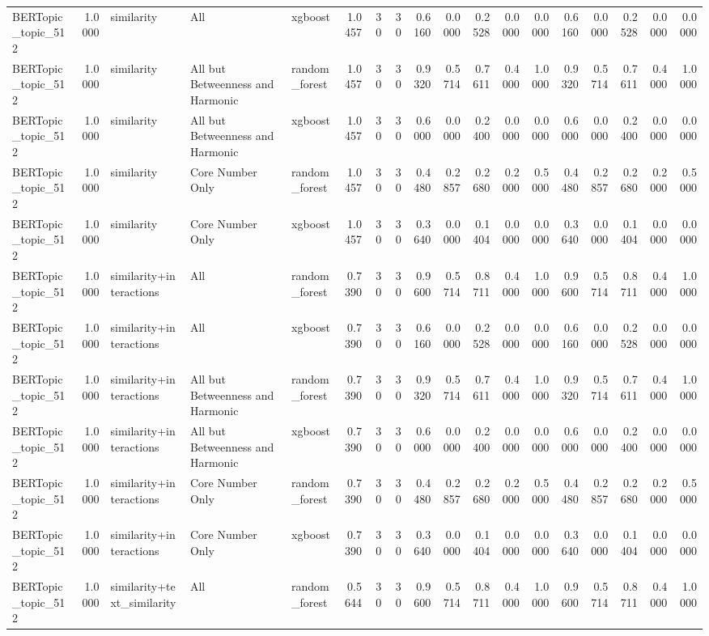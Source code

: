 \begin{tabular}{lrlllrrrrrrrrrrrrr}
BERTopic_topic_512 & 1.0000 & similarity & All & xgboost & 1.0457 & 30 & 30 & 0.6160 & 0.0000 & 0.2528 & 0.0000 & 0.0000 & 0.6160 & 0.0000 & 0.2528 & 0.0000 & 0.0000 \\
BERTopic_topic_512 & 1.0000 & similarity & All but Betweenness and Harmonic & random_forest & 1.0457 & 30 & 30 & 0.9320 & 0.5714 & 0.7611 & 0.4000 & 1.0000 & 0.9320 & 0.5714 & 0.7611 & 0.4000 & 1.0000 \\
BERTopic_topic_512 & 1.0000 & similarity & All but Betweenness and Harmonic & xgboost & 1.0457 & 30 & 30 & 0.6000 & 0.0000 & 0.2400 & 0.0000 & 0.0000 & 0.6000 & 0.0000 & 0.2400 & 0.0000 & 0.0000 \\
BERTopic_topic_512 & 1.0000 & similarity & Core Number Only & random_forest & 1.0457 & 30 & 30 & 0.4480 & 0.2857 & 0.2680 & 0.2000 & 0.5000 & 0.4480 & 0.2857 & 0.2680 & 0.2000 & 0.5000 \\
BERTopic_topic_512 & 1.0000 & similarity & Core Number Only & xgboost & 1.0457 & 30 & 30 & 0.3640 & 0.0000 & 0.1404 & 0.0000 & 0.0000 & 0.3640 & 0.0000 & 0.1404 & 0.0000 & 0.0000 \\
BERTopic_topic_512 & 1.0000 & similarity+interactions & All & random_forest & 0.7390 & 30 & 30 & 0.9600 & 0.5714 & 0.8711 & 0.4000 & 1.0000 & 0.9600 & 0.5714 & 0.8711 & 0.4000 & 1.0000 \\
BERTopic_topic_512 & 1.0000 & similarity+interactions & All & xgboost & 0.7390 & 30 & 30 & 0.6160 & 0.0000 & 0.2528 & 0.0000 & 0.0000 & 0.6160 & 0.0000 & 0.2528 & 0.0000 & 0.0000 \\
BERTopic_topic_512 & 1.0000 & similarity+interactions & All but Betweenness and Harmonic & random_forest & 0.7390 & 30 & 30 & 0.9320 & 0.5714 & 0.7611 & 0.4000 & 1.0000 & 0.9320 & 0.5714 & 0.7611 & 0.4000 & 1.0000 \\
BERTopic_topic_512 & 1.0000 & similarity+interactions & All but Betweenness and Harmonic & xgboost & 0.7390 & 30 & 30 & 0.6000 & 0.0000 & 0.2400 & 0.0000 & 0.0000 & 0.6000 & 0.0000 & 0.2400 & 0.0000 & 0.0000 \\
BERTopic_topic_512 & 1.0000 & similarity+interactions & Core Number Only & random_forest & 0.7390 & 30 & 30 & 0.4480 & 0.2857 & 0.2680 & 0.2000 & 0.5000 & 0.4480 & 0.2857 & 0.2680 & 0.2000 & 0.5000 \\
BERTopic_topic_512 & 1.0000 & similarity+interactions & Core Number Only & xgboost & 0.7390 & 30 & 30 & 0.3640 & 0.0000 & 0.1404 & 0.0000 & 0.0000 & 0.3640 & 0.0000 & 0.1404 & 0.0000 & 0.0000 \\
BERTopic_topic_512 & 1.0000 & similarity+text_similarity & All & random_forest & 0.5644 & 30 & 30 & 0.9600 & 0.5714 & 0.8711 & 0.4000 & 1.0000 & 0.9600 & 0.5714 & 0.8711 & 0.4000 & 1.0000 \\

\end{tabular}
